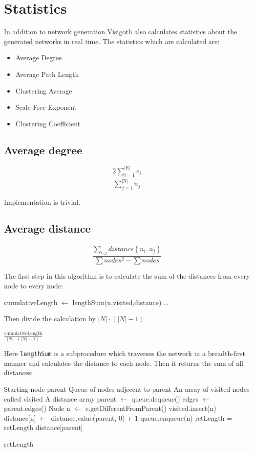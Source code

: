 \documentclass[a4paper,11pt,titlepage]{article}
\let\stdsection\section         %
\renewcommand{\section}{\newpage\stdsection}
\newcommand{\code}[1]{\texttt{#1}}
\begin{document}
\section{Statistics}
In addition to network generation Visigoth also calculates statistics about the
generated networks in real time. The statistics which are calculated are:

\begin{itemize}
  \item Average Degree
  \item Average Path Length
  \item Clustering Average
  \item Scale Free Exponent
  \item Clustering Coefficient
\end{itemize}


\subsection{Average degree}
\[ \frac{2\sum_{i=1}^{\mathrm{|E|}} e_i}
        {\sum_{j=1}^{\mathrm{|N|}} n_j}
\]

Implementation is trivial.


\subsection{Average distance}
\[ \frac{\sum_{i,j}distance(n_i,n_j)}
        {\sum nodes^2 - \sum nodes}
\]

The first step in this algorithm is to calculate the sum of the
distances from every node to every node:

\begin{algorithmic}
    \STATE cumulativeLength $\gets$ lengthSum(n,visited,distance)
    \STATE \dots
  \ENDFOR
\end{algorithmic}
Then divide the calculation by $|N| \cdot (|N| - 1)$
\begin{algorithmic}
  \RETURN $\frac{\mathrm{cumulativeLength}}{|N| \cdot (|N| - 1)}$
\end{algorithmic}

Here \code{lengthSum} is a subprocedure which traverses the network in a
breadth-first manner and calculates the distance to each node.
Then it returns the sum of all distances:

\begin{algorithmic}
  \REQUIRE Starting node parent
  \REQUIRE Queue of nodes adjecent to parent
  \REQUIRE An array of visited nodes called visited
  \REQUIRE A distance array
    \STATE parent $\gets$ queue.dequeue()
    \STATE edges $\gets$ parent.edges()
    \STATE Node n $\gets$ e.getDifferentFromParent()
        \STATE visited.insert(n)
        \STATE distance[n] $\gets$ distance.value(parent, 0) + 1
        \STATE queue.enqueue(n)
      \ENDIF
    \ENDFOR
    \STATE retLength = retLength distance[parent]
  \ENDWHILE

  \RETURN retLength
\end{algorithmic}
\end{document}
